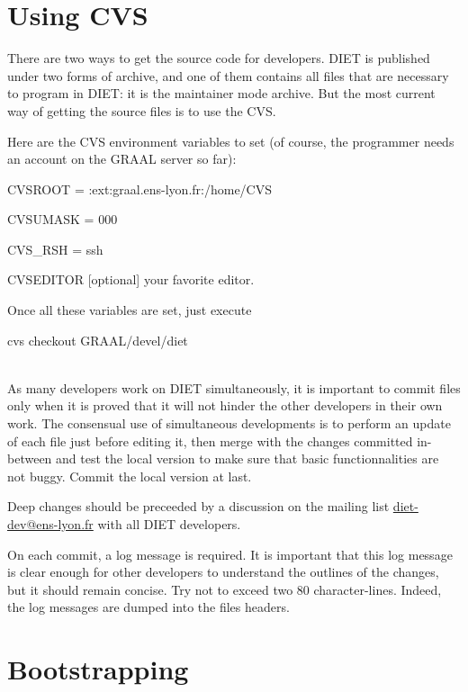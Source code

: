 \documentclass[11pt,a4paper]{report}
\begin{document}
\section{Using CVS}

There are two ways to get the source code for developers. DIET is published
under two forms of archive, and one of them contains all files that are
necessary to program in DIET: it is the maintainer mode archive. But the most
current way of getting the source files is to use the CVS.

Here are the CVS environment variables to set (of course, the programmer needs
an account on the GRAAL server so far):
\begin{description}
\item{\sf CVSROOT} \textsf{ = :ext:graal.ens-lyon.fr:/home/CVS}
\item{\sf CVSUMASK} \textsf{ = 000}
\item{\sf CVS\_RSH} \textsf{ = ssh}
\item{\sf CVSEDITOR [optional]} your favorite editor.
\end{description}

Once all these variables are set, just execute\\
\centerline{\sf cvs checkout GRAAL/devel/diet}\\


As many developers work on DIET simultaneously, it is important to commit files
only when it is proved that it will not hinder the other developers in their own
work. The consensual use of simultaneous developments is to perform an update of
each file just before editing it, then merge with the changes committed
in-between and test the local version to make sure that basic functionnalities
are not buggy. Commit the local version at last.

Deep changes should be preceeded by a discussion on the mailing list
\url{diet-dev@ens-lyon.fr} with all DIET developers.

On each commit, a log message is required. It is important that this log message
is clear enough for other developers to understand the outlines of the changes,
but it should remain concise. Try not to exceed two 80 character-lines.  Indeed,
the log messages are dumped into the files headers.


\section{Bootstrapping}
\end{document}
